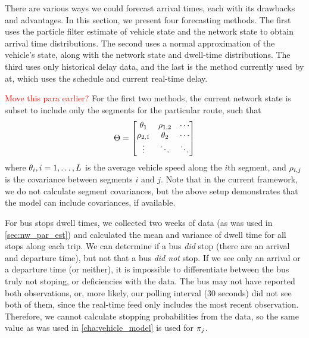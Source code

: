 There are various ways we could forecast arrival times, each with its drawbacks and advantages. In this section, we present four forecasting methods. The first uses the particle filter estimate of vehicle state and the network state to obtain arrival time distributions. The second uses a normal approximation of the vehicle's state, along with the network state and dwell-time distributions. The third uses only historical delay data, and the last is the method currently used by \gls{at}, which uses the schedule and current real-time delay.

\textcolor{red}{Move this para earlier?}
For the first two methods, the current network state is subset to include only the segments for the particular route, such that
\begin{equation}
\label{eq:route_nw_state}
\Theta =
\begin{bmatrix}
\theta_{1} & \rho_{1,2} & \cdots \\
\rho_{2,1} & \theta_{2} & \cdots \\
\vdots & \ddots & \ddots
\end{bmatrix}
\end{equation}
where $\theta_{i}, i = 1, \ldots, L$ is the average vehicle speed along the $i$th segment, and $\rho_{i,j}$ is the covariance between segments $i$ and $j$. Note that in the current framework, we do not calculate segment covariances, but the above setup demonstrates that the model can include covariances, if available.

For bus stops dwell times, we collected two weeks of data (as was used in \cref{sec:nw_par_est}) and calculated the mean and variance of dwell time for all stops along each trip. We can determine if a bus \emph{did} stop (there are an arrival and departure time), but not that a bus \emph{did not} stop. If we see only an arrival or a departure time (or neither), it is impossible to differentiate between the bus truly not stoping, or deficiencies with the data. The bus may not have reported both observations, or, more likely, our polling interval (30 seconds) did not see both of them, since the real-time feed only includes the most recent observation. Therefore, we cannot calculate stopping probabilities from the data, so the same value as was used in \cref{cha:vehicle_model} is used for $\pi_j$.





